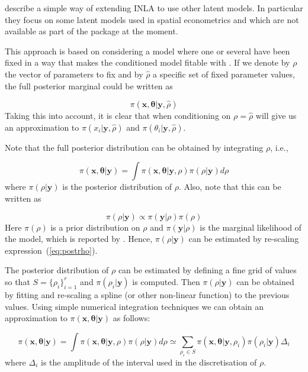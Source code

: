 \documentclass[article]{jss}
\begin{document}
\citet{Bivandetal:2013} describe a simple way of extending INLA to use other
latent models.  In particular they focus on some latent models used in spatial
econometrics and which are not available as part of the  package at
the moment.

This approach is based on considering a model where one or several have been
fixed in a way that makes the conditioned model fitable with .  If
we denote by $\rho$ the vector of parameters to fix and by $\hat{\rho}$ a
specific set of fixed parameter values,  the full posterior marginal could be
written as


$$
\pi(\mathbf{x}, \mathbf{\theta}|\mathbf{y}, \hat{\rho}) 
$$
\noindent
Taking this into account,  it is clear that when conditioning on
$\rho=\hat\rho$  will give us an approximation to
$\pi(x_i|\mathbf{y}, \hat{\rho})$ and $\pi(\theta_i|\mathbf{y}, \hat{\rho})$.



Note that the full posterior distribution can be obtained by integrating $\rho$,
i.e.,

\begin{equation}
\pi(\mathbf{x}, \mathbf{\theta}|\mathbf{y}) = 
\int \pi(\mathbf{x}, \mathbf{\theta}|\mathbf{y}, \rho)\pi(\rho|\mathbf{y})d\rho
\label{eq:fullpost}
\end{equation}
\noindent
where $\pi(\rho|\mathbf{y})$ is the posterior distribution of $\rho$. Also,
note that this can be written as

\begin{equation}
\pi(\rho|\mathbf{y}) \propto \pi(\mathbf{y}|\rho) \pi(\rho)
\label{eq:postrho}
\end{equation}
\noindent
Here $\pi(\rho)$ is a prior distribution on $\rho$ and $\pi(\mathbf{y}|\rho)$
is the marginal likelihood of the model, which is reported by .
Hence, $\pi(\rho|\mathbf{y})$ can be estimated by re-scaling
expression~(\ref{eq:postrho}).


The posterior distribution of $\rho$ can be estimated by defining a fine grid
of values so that $S=\{\rho_i\}_{i=1}^r$ and $\pi(\rho_i|\mathbf{y})$ is
computed.  Then $\pi(\rho|\mathbf{y})$ can be obtained by fitting and
re-scaling a spline (or other non-linear function) to the previous values.
Using simple numerical integration techniques we can obtain an approximation to
$\pi(\mathbf{x}, \mathbf{\theta}|\mathbf{y})$ as follows:

\begin{equation}
\pi(\mathbf{x}, \mathbf{\theta}|\mathbf{y}) = \int \pi(\mathbf{x}, \mathbf{\theta}|\mathbf{y}, \rho)\pi(\rho|\mathbf{y})d\rho
\simeq
\sum_{\rho_i\in S}\pi(\mathbf{x}, \mathbf{\theta}|\mathbf{y}, \rho_i)  
\pi(\rho_i|\mathbf{y}) \Delta_i
\label{eq:fullpostapp}
\end{equation}
\noindent
where $\Delta_i$ is the amplitude of the interval used in the discretisation
of $\rho$.
\end{document}
